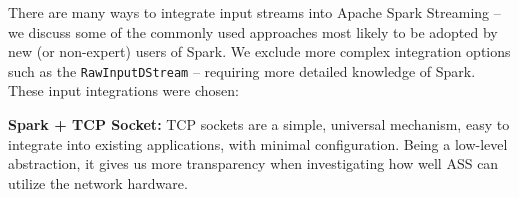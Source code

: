 \documentclass[conference]{IEEEtran}
\begin{document}
There are many ways to integrate input streams into Apache Spark Streaming -- we discuss some of the commonly used approaches most likely to be adopted by new (or non-expert) users of Spark. We exclude more complex integration options such as the \texttt{RawInputDStream} -- requiring more detailed knowledge of Spark. These input integrations were chosen:








\textbf{Spark + TCP Socket:} TCP sockets are a simple, universal mechanism, easy to integrate into existing applications, with minimal configuration. Being a low-level abstraction, it gives us more transparency when investigating how well ASS can utilize the network hardware. 

\end{document}
